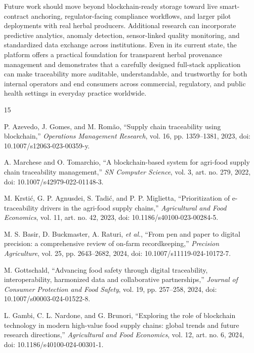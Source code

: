 \documentclass[conference]{IEEEtran}
\begin{document}
Future work should move beyond blockchain-ready storage toward live smart-contract anchoring, regulator-facing compliance workflows, and larger pilot deployments with real herbal producers. Additional research can incorporate predictive analytics, anomaly detection, sensor-linked quality monitoring, and standardized data exchange across institutions. Even in its current state, the platform offers a practical foundation for transparent herbal provenance management and demonstrates that a carefully designed full-stack application can make traceability more auditable, understandable, and trustworthy for both internal operators and end consumers across commercial, regulatory, and public health settings in everyday practice worldwide.

\begin{thebibliography}{15}

P. Azevedo, J. Gomes, and M. Rom\~ao, ``Supply chain traceability using blockchain,'' \emph{Operations Management Research}, vol. 16, pp. 1359--1381, 2023, doi: 10.1007/s12063-023-00359-y.

A. Marchese and O. Tomarchio, ``A blockchain-based system for agri-food supply chain traceability management,'' \emph{SN Computer Science}, vol. 3, art. no. 279, 2022, doi: 10.1007/s42979-022-01148-3.

M. Krsti\'c, G. P. Agnusdei, S. Tadi\'c, and P. P. Miglietta, ``Prioritization of e-traceability drivers in the agri-food supply chains,'' \emph{Agricultural and Food Economics}, vol. 11, art. no. 42, 2023, doi: 10.1186/s40100-023-00284-5.

M. S. Basir, D. Buckmaster, A. Raturi, \emph{et al.}, ``From pen and paper to digital precision: a comprehensive review of on-farm recordkeeping,'' \emph{Precision Agriculture}, vol. 25, pp. 2643--2682, 2024, doi: 10.1007/s11119-024-10172-7.

M. Gottschald, ``Advancing food safety through digital traceability, interoperability, harmonized data and collaborative partnerships,'' \emph{Journal of Consumer Protection and Food Safety}, vol. 19, pp. 257--258, 2024, doi: 10.1007/s00003-024-01522-8.

L. Gambi, C. L. Nardone, and G. Brunori, ``Exploring the role of blockchain technology in modern high-value food supply chains: global trends and future research directions,'' \emph{Agricultural and Food Economics}, vol. 12, art. no. 6, 2024, doi: 10.1186/s40100-024-00301-1.


\end{thebibliography}
\end{document}

